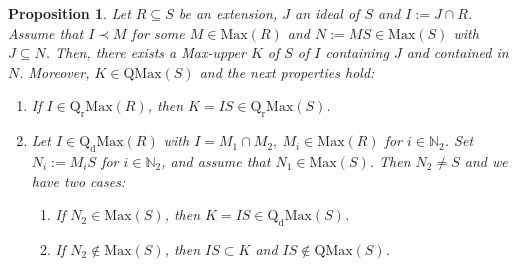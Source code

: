 \documentclass[12pt,leqno]{amsart}
\newtheorem{proposition}[theorem]{Proposition}
\theoremstyle{definition}
\begin{document}
\begin{proposition}\label{3.52} Let $R\subseteq S$ be an extension, $J$ an ideal of $S$ and $I:=J\cap R$. Assume that $I\prec M$ for some $M\in\mathrm{Max}(R)$ and $N:=MS\in\mathrm{Max}(S)$ with $J\subseteq N$. Then, there exists a Max-upper $K$ of $S$ of $I$ containing $J$ and contained in $N$. Moreover, $K\in\mathrm{QMax}(S)$ and the next 
  properties hold:
\begin{enumerate} 
\item If $I\in\mathrm{Q_rMax}(R)$, then $K=IS\in\mathrm{Q_rMax}(S)$. 
\item Let $I\in\mathrm{Q_dMax}(R)$ with $I=M_1\cap M_2,\ M_i\in\mathrm {Max}(R)$ for $i\in\mathbb N_2$. Set $N_i:=M_iS$ for $i\in\mathbb N_2$, and assume that $N_1\in\mathrm{Max}(S)$. Then $N_2\neq S$ and we have two cases: 
\begin{enumerate}
\item If $N_2\in\mathrm{Max}(S)$, then $K=IS\in\mathrm{Q_dMax}(S)$.  
\item If $N_2\not\in\mathrm{Max}(S)$, then $IS\subset K$ and $IS\not\in \mathrm{QMax}(S)$.
\end{enumerate}
\end{enumerate}
\end{proposition}
\end{document}

